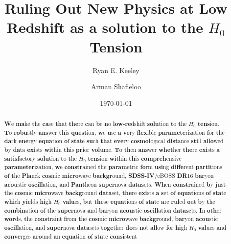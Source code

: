 \documentclass[
 reprint,
 amsmath,amssymb,
 aps,
]{revtex4-2}
\begin{document}

\title{Ruling Out New Physics at Low Redshift as a solution to the $H_0$ Tension}

\author{Ryan E. Keeley}
\author{Arman Shafieloo}




\date{\today}

\begin{abstract} 
\textbf{W}e \textbf{ma}ke \textbf{t}he \textbf{ca}se \textbf{th}at \textbf{the}re \textbf{c}an \textbf{b}e \textbf{n}o \textbf{low-re}dshift \textbf{solu}tion \textbf{t}o \textbf{t}he $H_0$ \textbf{tens}ion. \textbf{T}o \textbf{robu}stly \textbf{ans}wer \textbf{th}is \textbf{quest}ion, \textbf{w}e \textbf{u}se \textbf{a} \textbf{ve}ry \textbf{flex}ible \textbf{paramete}rization \textbf{f}or \textbf{t}he \textbf{da}rk \textbf{ene}rgy \textbf{equa}tion \textbf{o}f \textbf{sta}te \textbf{su}ch \textbf{th}at \textbf{eve}ry \textbf{cosmol}ogical \textbf{dist}ance \textbf{sti}ll \textbf{allo}wed \textbf{b}y \textbf{da}ta \textbf{exi}sts \textbf{wit}hin \textbf{th}is \textbf{pri}or \textbf{volu}me. \textbf{T}o \textbf{th}en \textbf{ans}wer \textbf{whet}her \textbf{the}re \textbf{exi}sts \textbf{a} \textbf{satisf}actory \textbf{solu}tion \textbf{t}o \textbf{t}he $H_0$ \textbf{tens}ion \textbf{wit}hin \textbf{th}is \textbf{compreh}ensive \textbf{parameter}ization, \textbf{w}e \textbf{constr}ained \textbf{t}he \textbf{param}etric \textbf{fo}rm \textbf{usi}ng \textbf{diffe}rent \textbf{parti}tions \textbf{o}f \textbf{t}he \textbf{Pla}nck \textbf{cos}mic \textbf{micro}wave \textbf{backgr}ound, \textbf{SDSS-IV}/eBOSS \textbf{DR}16 \textbf{bar}yon \textbf{acou}stic \textbf{oscill}ation, \textbf{a}nd \textbf{Pant}heon \textbf{super}nova \textbf{datas}ets. \textbf{Wh}en \textbf{constr}ained \textbf{b}y \textbf{ju}st \textbf{t}he \textbf{cos}mic \textbf{micro}wave \textbf{backg}round \textbf{data}set, \textbf{the}re \textbf{exi}sts \textbf{a} \textbf{s}et \textbf{o}f \textbf{equat}ions \textbf{o}f \textbf{sta}te \textbf{whi}ch \textbf{yie}lds \textbf{hi}gh $H_0$ \textbf{valu}es, \textbf{b}ut \textbf{the}se \textbf{equat}ions \textbf{o}f \textbf{sta}te \textbf{a}re \textbf{rul}ed \textbf{o}ut \textbf{b}y \textbf{t}he \textbf{combin}ation \textbf{o}f \textbf{t}he \textbf{super}nova \textbf{a}nd \textbf{bar}yon \textbf{acou}stic \textbf{oscill}ation \textbf{datas}ets. \textbf{I}n \textbf{oth}er \textbf{wor}ds, \textbf{t}he \textbf{const}raint \textbf{fr}om \textbf{t}he \textbf{cos}mic \textbf{micro}wave \textbf{backgr}ound, \textbf{bar}yon \textbf{acou}stic \textbf{oscill}ation, \textbf{a}nd \textbf{super}nova \textbf{data}sets \textbf{toge}ther \textbf{do}es \textbf{n}ot \textbf{all}ow \textbf{f}or \textbf{hi}gh $H_0$ \textbf{val}ues \textbf{a}nd \textbf{conve}rges \textbf{aro}und \textbf{a}n \textbf{equa}tion \textbf{o}f \textbf{sta}te \textbf{consi}stent 
\end{abstract}
\end{document}
